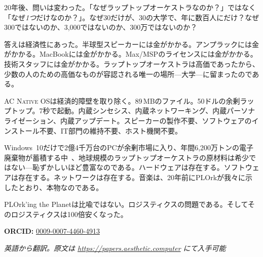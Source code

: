 \documentclass[10pt,letterpaper,twocolumn]{article}
\newcommand{\acos}{\textsc{AC Native OS}}
\begin{document}
20年後、問いは変わった。「なぜラップトップオーケストラなのか？」ではなく「なぜ\emph{1つ}だけなのか？」。なぜ30だけが、30の大学で、年に数百人にだけ？なぜ300ではないのか、3,000ではないのか、300万ではないのか？

答えは経済性にあった。半球型スピーカーには金がかかる。アンプラックには金がかかる。MacBookには金がかかる。Max/MSPのライセンスには金がかかる。技術スタッフには金がかかる。ラップトップオーケストラは高価であったから、少数の人のための高価なものが容認される唯一の場所---大学---に留まったのである。

\acos{}は経済的障壁を取り除く。89\,MBのファイル。50ドルの余剰ラップトップ。7秒で起動。内蔵シンセシス、内蔵ネットワーキング、内蔵パーソナライゼーション、内蔵アップデート。スピーカーの製作不要、ソフトウェアのインストール不要、IT部門の維持不要、ホスト機関不要。

Windows~10だけで2億4千万台のPCが余剰市場に入り、年間6,200万トンの電子廃棄物が蓄積する中~\citep{forti2024ewaste}、地球規模のラップトップオーケストラの原材料は希少ではない---恥ずかしいほど豊富なのである。ハードウェアは存在する。ソフトウェアは存在する。ネットワークは存在する。音楽は、20年前にPLOrkが我々に示したとおり、本物なのである。

PLOrk'ing the Planetは比喩ではない。ロジスティクスの問題である。そしてそのロジスティクスは100倍安くなった。

\vspace{0.5em}
\noindent\textbf{ORCID:} \href{https://orcid.org/0009-0007-4460-4913}{0009-0007-4460-4913}

\vspace{0.5em}
\noindent\textit{英語から翻訳。原文は \url{https://papers.aesthetic.computer} にて入手可能}




\end{document}
